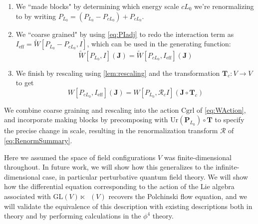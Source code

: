 \documentclass[12pt]{article}
\theoremstyle{definition}
\theoremstyle{plain}
\newcommand{\Symp}{\mathop{\mathrm{Sym}_2^+}}
\begin{document}
\begin{enumerate}
    \item We ``made blocks" by determining which energy scale $cL_0$ we're renormalizing to by writing \( P_{L_0} = (P_{L_0} - P_{cL_0}) + P_{cL_0} \).  
    \item We ``coarse grained" by using \autoref{eq:PIadj} to redo the interaction term as $I_{\text{eff}} = \tilde{W}[P_{L_0}-P_{cL_0},I]$, which can be used in the generating function:
    \begin{equation}
        \tilde{W}[P_{L_0},I](\mathbf{J}) = \tilde{W}[P_{c L_0},I_{\text{eff}}](\mathbf{J})
    \end{equation}
    \item We finish by rescaling using \autoref{lem:rescaling} and the transformation $\mathbf{T}_c:V\to V$ to get
    \begin{equation}
        W[P_{c L_0},I_{\text{eff}}](\mathbf{J}) = W[P_{L_0},\mathcal{R}_{c} I](\mathbf{J}\circ \mathbf{T}_c)
    \end{equation}
\end{enumerate}

We combine coarse graining and rescaling into the action $\mathrm{Cgrl}$ of \autoref{eq:WAction}, and incorporate making blocks by precomposing with $\mathrm{Ur}(\mathbf{P}_{L_0})\circ\mathbf{T}$ to specify the precise change in scale, resulting in the renormalization transform $\mathcal{R}$ of \autoref{eq:RenormSummary}.

Here we assumed the space of field configurations $V$ was finite-dimensional throughout. In future work, we will show how this generalizes to the infinite-dimensional case, in particular perturbative quantum field theory.  We will show how the differential equation corresponding to the action of the Lie algebra associated with $\mathrm{GL}(V)\ltimes \Symp(V)$ recovers the Polchinski flow equation, and we will validate the equivalence of this description with existing descriptions both in theory and by performing calculations in the $\phi^4$ theory.
 



\end{document}
